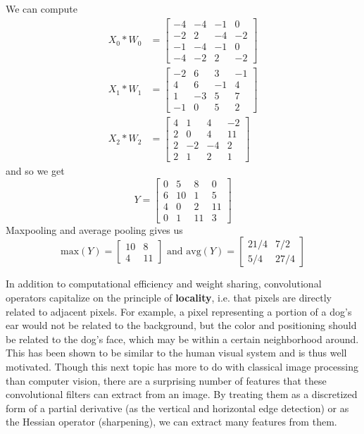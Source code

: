   \begin{solution}
    We can compute 
    \begin{align*} 
      X_0 \ast  W_0 & = \begin{bmatrix} -4 & -4 & -1 & 0 \\ -2 & 2 & -4 & -2 \\ -1 & -4 & -1 & 0 \\ -4 & -2 & 2 & -2 \end{bmatrix} \\
      X_1 \ast W_1 & = \begin{bmatrix} -2 & 6 & 3 & -1 \\ 4 & 6 & -1 & 4 \\ 1 & -3 & 5 & 7 \\ -1 & 0 & 5 & 2 \end{bmatrix} \\
      X_2 \ast W_2 & = \begin{bmatrix} 4 & 1 & 4 & -2 \\ 2 & 0 & 4 & 11 \\ 2 & -2 & -4 & 2 \\ 2 & 1 & 2 & 1 \end{bmatrix}
    \end{align*}
    and so we get 
    \begin{equation}
      Y = \begin{bmatrix} 0 & 5 & 8 & 0 \\ 6 & 10 & 1 & 5 \\ 4 &  0 & 2 & 11 \\ 0 & 1 & 11 & 3 \end{bmatrix}
    \end{equation}
    Maxpooling and average pooling gives us 
    \begin{equation}
      \mathrm{max}(Y) = \begin{bmatrix} 10 & 8 \\ 4 & 11 \end{bmatrix} \text{ and } \mathrm{avg}(Y) = \begin{bmatrix} 21/4 & 7/2 \\ 5/4 & 27/4 \end{bmatrix}
    \end{equation}
  \end{solution}

  In addition to computational efficiency and weight sharing, convolutional operators capitalize on the principle of \textbf{locality}, i.e. that pixels are directly related to adjacent pixels. For example, a pixel representing a portion of a dog's ear would not be related to the background, but the color and positioning should be related to the dog's face, which may be within a certain neighborhood around. This has been shown to be similar to the human visual system and is thus well motivated. Though this next topic has more to do with classical image processing than computer vision, there are a surprising number of features that these convolutional filters can extract from an image. By treating them as a discretized form of a partial derivative (as the vertical and horizontal edge detection) or as the Hessian operator (sharpening), we can extract many features from them.  

